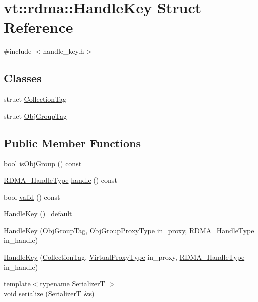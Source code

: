 \hypertarget{structvt_1_1rdma_1_1_handle_key}{}\section{vt\+:\+:rdma\+:\+:Handle\+Key Struct Reference}
\label{structvt_1_1rdma_1_1_handle_key}


{\ttfamily \#include $<$handle\+\_\+key.\+h$>$}

\subsection*{Classes}
\begin{DoxyCompactItemize}
\item 
struct \hyperlink{structvt_1_1rdma_1_1_handle_key_1_1_collection_tag}{Collection\+Tag}
\item 
struct \hyperlink{structvt_1_1rdma_1_1_handle_key_1_1_obj_group_tag}{Obj\+Group\+Tag}
\end{DoxyCompactItemize}
\subsection*{Public Member Functions}
\begin{DoxyCompactItemize}
\item 
bool \hyperlink{structvt_1_1rdma_1_1_handle_key_a22f6eb0a9075cf1e52b7660816b7fbdf}{is\+Obj\+Group} () const
\item 
\hyperlink{namespacevt_a10442579ec4e7ebef223818e64bcf908}{R\+D\+M\+A\+\_\+\+Handle\+Type} \hyperlink{structvt_1_1rdma_1_1_handle_key_a242f0565b49f78b3574ff2a5dda04b83}{handle} () const
\item 
bool \hyperlink{structvt_1_1rdma_1_1_handle_key_af14c7f2ccbc5129259dc642c14bdc792}{valid} () const
\item 
\hyperlink{structvt_1_1rdma_1_1_handle_key_ac6ce62340f11f9e63f16297366952fec}{Handle\+Key} ()=default
\item 
\hyperlink{structvt_1_1rdma_1_1_handle_key_a73ee0c4261ec7b7e007cb8da8b2ff86f}{Handle\+Key} (\hyperlink{structvt_1_1rdma_1_1_handle_key_1_1_obj_group_tag}{Obj\+Group\+Tag}, \hyperlink{namespacevt_ad7cae989df485fccca57f0792a880a8e}{Obj\+Group\+Proxy\+Type} in\+\_\+proxy, \hyperlink{namespacevt_a10442579ec4e7ebef223818e64bcf908}{R\+D\+M\+A\+\_\+\+Handle\+Type} in\+\_\+handle)
\item 
\hyperlink{structvt_1_1rdma_1_1_handle_key_a0fe8e2149d12df5aaa6cd7d9da08dd31}{Handle\+Key} (\hyperlink{structvt_1_1rdma_1_1_handle_key_1_1_collection_tag}{Collection\+Tag}, \hyperlink{namespacevt_a1b417dd5d684f045bb58a0ede70045ac}{Virtual\+Proxy\+Type} in\+\_\+proxy, \hyperlink{namespacevt_a10442579ec4e7ebef223818e64bcf908}{R\+D\+M\+A\+\_\+\+Handle\+Type} in\+\_\+handle)
\item 
{\footnotesize template$<$typename SerializerT $>$ }\\void \hyperlink{structvt_1_1rdma_1_1_handle_key_aa9b8b06a7ab1cfaaf2b3aed395dbbf60}{serialize} (SerializerT \&s)
\end{DoxyCompactItemize}
